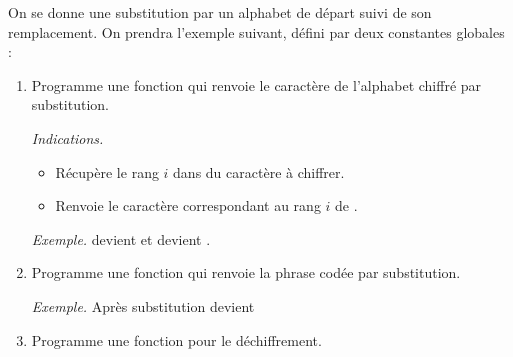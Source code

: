 \documentclass[11pt,class=report,crop=false]{standalone}
\begin{document}
\begin{activite}



On se donne une substitution par un alphabet de départ suivi de son remplacement. On prendra l'exemple suivant, défini par deux constantes globales :

\begin{enumerate}
  \item Programme une fonction 
  qui renvoie le caractère de l'alphabet chiffré par substitution.
  
  \emph{Indications.}
  \begin{itemize}
    \item Récupère le rang $i$ dans  du caractère à chiffrer.
    \item Renvoie le caractère correspondant au rang $i$ de .
  \end{itemize}
  
  \emph{Exemple.}
   devient  et  devient .
  
  \item Programme une fonction  qui renvoie la phrase codée par substitution.
    
   \emph{Exemple.}
  Après substitution  devient 
   
  \item Programme une fonction  pour le déchiffrement.
   
\end{enumerate}  
    
\end{activite}



\end{document}
